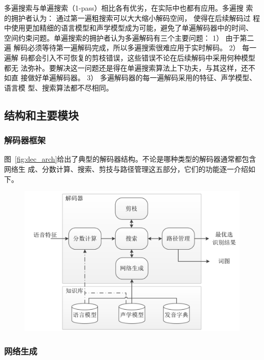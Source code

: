 多遍搜索与单遍搜索（1-pass）相比各有优劣，在实际中也都有应用。多遍搜
索的拥护者认为： 通过第一遍粗搜索可以大大缩小解码空间， 使得在后续解码过
程中使用更加精细的语言模型和声学模型成为可能，避免了单遍解码器中的时间、
空间约束问题。单遍搜索的拥护者认为多遍解码有三个主要问题： 1） 由于第二遍
解码必须等待第一遍解码完成，所以多遍搜索很难应用于实时解码。 2） 每一遍解
码都会引入不可恢复的剪枝错误，这些错误不论在后续解码中采用何种模型都无
法弥补。要解决这一问题还是得在单遍搜索算法上下功夫，与其这样，还不如直
接做好单遍解码器。 3） 多遍解码器的每一遍解码采用的特征、声学模型、语言模
型、搜索算法都不尽相同。

\subsection{结构和主要模块}
\label{chap:intro-lvcsr-decmodule}

\subsubsection{解码器框架}

图~\ref{fig:dec_arch}给出了典型的解码器结构。不论是哪种类型的解码器通常都包含网络生
成、分数计算、搜索、剪技与路径管理这五部分，它们的功能逐一介绍如下。

\begin{figure}[!htp]
  \centering
    \captionstyle{\centering}
    \includegraphics[clip=true, width=.9\textwidth]{figure/dec_arch.png}
\end{figure}


\subsubsection{网络生成}

